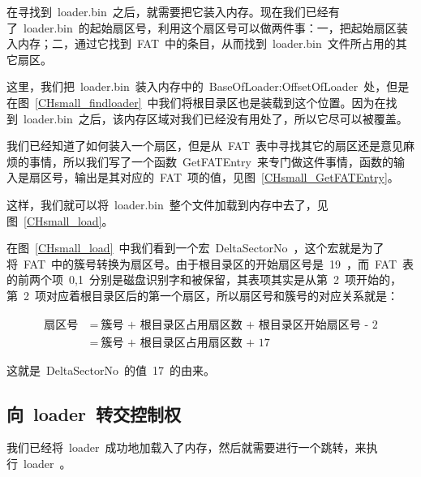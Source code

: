 在寻找到~loader.bin~之后，就需要把它装入内存。现在我们已经有了~loader.bin~的起始扇区号，利用这个扇区号可以做两件事：一，把起始扇区装入内存；二，通过它找到~FAT~中的条目，从而找到~loader.bin~文件所占用的其它扇区。

这里，我们把~loader.bin~装入内存中的~BaseOfLoader:OffsetOfLoader~处，但是在图~\ref{CHsmall_findloader}~中我们将根目录区也是装载到这个位置。因为在找到~loader.bin~之后，该内存区域对我们已经没有用处了，所以它尽可以被覆盖。

我们已经知道了如何装入一个扇区，但是从~FAT~表中寻找其它的扇区还是意见麻烦的事情，所以我们写了一个函数~GetFATEntry~来专门做这件事情，函数的输入是扇区号，输出是其对应的~FAT~项的值，见图~\ref{CHsmall_GetFATEntry}。

\label{CHsmall_GetFATEntry}

这样，我们就可以将~loader.bin~整个文件加载到内存中去了，见图~\ref{CHsmall_load}。

\label{CHsmall_load}

在图~\ref{CHsmall_load}~中我们看到一个宏~DeltaSectorNo~，这个宏就是为了将~FAT~中的簇号转换为扇区号。由于根目录区的开始扇区号是~19~，而~FAT~表的前两个项~0,1~分别是磁盘识别字和被保留，其表项其实是从第~2~项开始的，第~2~项对应着根目录区后的第一个扇区，所以扇区号和簇号的对应关系就是：

\begin{align*}
\mbox{扇区号}~&=~\mbox{簇号~+~根目录区占用扇区数~+~根目录区开始扇区号~-~2}\\
 &=~\mbox{簇号~+~根目录区占用扇区数~+~17}
\end{align*}

这就是~DeltaSectorNo~的值~17~的由来。

\subsection{向~loader~转交控制权}

我们已经将~loader~成功地加载入了内存，然后就需要进行一个跳转，来执行~loader~。

\label{CHsmall_jump}

